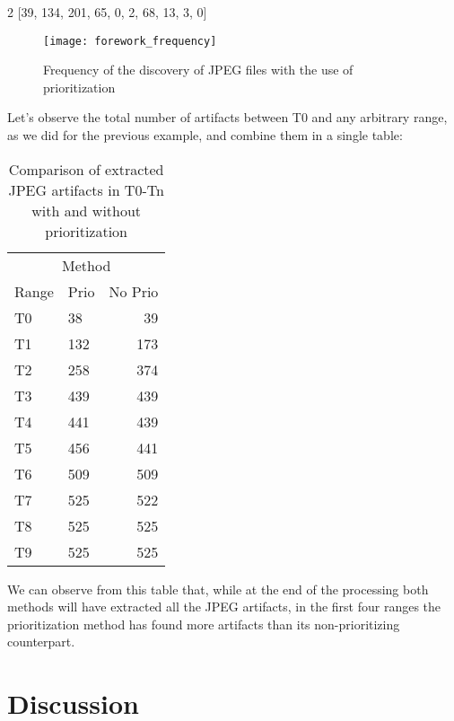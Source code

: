 \documentclass[twoside]{article}
\begin{document}
\begin{multicols}{2}
[39, 134, 201, 65, 0, 2, 68, 13, 3, 0]


\begin{figure}[H]
    \centering
    \texttt{[image: forework\_frequency]}
    \caption{Frequency of the discovery of JPEG files with the use of prioritization}
    \label{fig:forework_frequency}
\end{figure}

Let's observe the total number of artifacts between T0 and any arbitrary range,
as we did for the previous example, and combine them in a single table:

\begin{table}[H]
\caption{Comparison of extracted JPEG artifacts in T0-Tn with and without prioritization}
\centering
\begin{tabular}{llr}
\toprule
\multicolumn{3}{c}{Method} \\
\cmidrule(r){2-3}
Range & Prio & No Prio \\
\midrule

T0 & 38  & 39 \\
T1 & 132 & 173 \\
T2 & 258 & 374 \\
T3 & 439 & 439 \\
T4 & 441 & 439 \\
T5 & 456 & 441 \\
T6 & 509 & 509 \\
T7 & 525 & 522 \\
T8 & 525 & 525 \\
T9 & 525 & 525 \\

\bottomrule
\end{tabular}
\end{table}

We can observe from this table that, while at the end of the processing both
methods will have extracted all the JPEG artifacts, in the first four ranges the
prioritization method has found more artifacts than its non-prioritizing
counterpart.


%
%


\section{Discussion}


\end{multicols}
\end{document}
